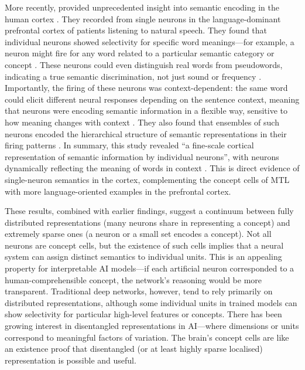 More recently, \citet{jamali2024semantic_encoding} provided unprecedented insight into semantic encoding in the human cortex \citep{jamali2024semantic_encoding}.
They recorded from single neurons in the language-dominant prefrontal cortex of patients listening to natural speech.
They found that individual neurons showed selectivity for specific word meanings---for example, a neuron might fire for any word related to a particular semantic category or concept \citep{jamali2024semantic_encoding}.
These neurons could even distinguish real words from pseudowords, indicating a true semantic discrimination, not just sound or frequency \citep{jamali2024semantic_encoding}.
Importantly, the firing of these neurons was context-dependent: the same word could elicit different neural responses depending on the sentence context, meaning that neurons were encoding semantic information in a flexible way, sensitive to how meaning changes with context \citep{jamali2024semantic_encoding}.
They also found that ensembles of such neurons encoded the hierarchical structure of semantic representations in their firing patterns \citep{jamali2024semantic_encoding}. 
In summary, this study revealed ``a fine-scale cortical representation of semantic information by individual neurons'', with neurons dynamically reflecting the meaning of words in context \citep{jamali2024semantic_encoding}.
This is direct evidence of single-neuron semantics in the cortex, complementing the concept cells of MTL with more language-oriented examples in the prefrontal cortex.

These results, combined with earlier findings, suggest a continuum between fully distributed representations (many neurons share in representing a concept) and extremely sparse ones (a neuron or a small set encodes a concept).
Not all neurons are concept cells, but the existence of such cells implies that a neural system can assign distinct semantics to individual units.
This is an appealing property for interpretable AI models---if each artificial neuron corresponded to a human-comprehensible concept, the network’s reasoning would be more transparent.
Traditional deep networks, however, tend to rely primarily on distributed representations, although some individual units in trained models can show selectivity for particular high-level features or concepts.
There has been growing interest in disentangled representations in AI---where dimensions or units correspond to meaningful factors of variation.
The brain’s concept cells are like an existence proof that disentangled (or at least highly sparse localised) representation is possible and useful.

